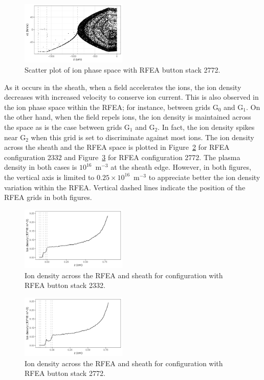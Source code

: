 \begin{figure}[htbp]
\centering
\includegraphics[width=0.45\textwidth]{Figures/RFEAPhaseSpace2772.jpeg}
\caption{Scatter plot of ion phase space with RFEA button stack 2772.}
\label{fig:RFEAPhaseSpace2772}
\end{figure}

As it occurs in the sheath, when a field accelerates the ions, the ion density decreases with increased velocity to conserve ion current. This is also observed in the ion phase space within the RFEA; for instance, between grids G$_0$ and G$_1$. On the other hand, when the field repels ions, the ion density is maintained across the space as is the case between grids G$_1$ and G$_2$. In fact, the ion density spikes near G$_2$ when this grid is set to discriminate against most ions. The ion density across the sheath and the RFEA space is plotted in Figure~\ref{fig:ionDensity2332} for RFEA configuration 2332 and Figure~\ref{fig:ionDensity2772} for RFEA configuration 2772. The plasma density in both cases is $10^{16}$~m$^{-3}$ at the sheath edge. However, in both figures, the vertical axis is limited to $0.25 \times 10^{16}$~m$^{-3}$ to appreciate better the ion density variation within the RFEA. Vertical dashed lines indicate the position of the RFEA grids in both figures. 

\begin{figure}[htbp]
\centering
\includegraphics[width=0.45\textwidth]{Figures/ionDensity2332.jpeg}
\caption{Ion density across the RFEA and sheath for configuration with RFEA button stack 2332.}
\label{fig:ionDensity2332}
\end{figure}

\begin{figure}[htbp]
\centering
\includegraphics[width=0.45\textwidth]{Figures/ionDensity2772.jpeg}
\caption{Ion density across the RFEA and sheath for configuration with RFEA button stack 2772.}
\label{fig:ionDensity2772}
\end{figure}

